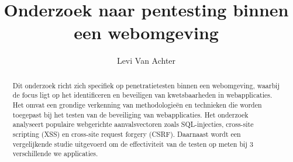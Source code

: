 \documentclass{hogent-article}
\title{Onderzoek naar pentesting binnen een webomgeving}
\author{Levi Van Achter}
\begin{document}
\begin{abstract}
  Dit onderzoek richt zich specifiek op penetratietesten binnen een webomgeving, waarbij de focus ligt op het
identificeren en beveiligen van kwetsbaarheden in webapplicaties. Het omvat een grondige verkenning van
methodologieën en technieken die worden toegepast bij het testen van de beveiliging van webapplicaties. Het
onderzoek analyseert populaire webgerichte aanvalsvectoren zoals SQL-injecties, cross-site scripting (XSS) en
cross-site request forgery (CSRF). Daarnaast wordt een vergelijkende studie uitgevoerd om de effectiviteit van
de testen op meten bij 3 verschillende we applicaties.
\end{abstract}

\tableofcontents



\printbibliography[heading=bibintoc]
\end{document}
